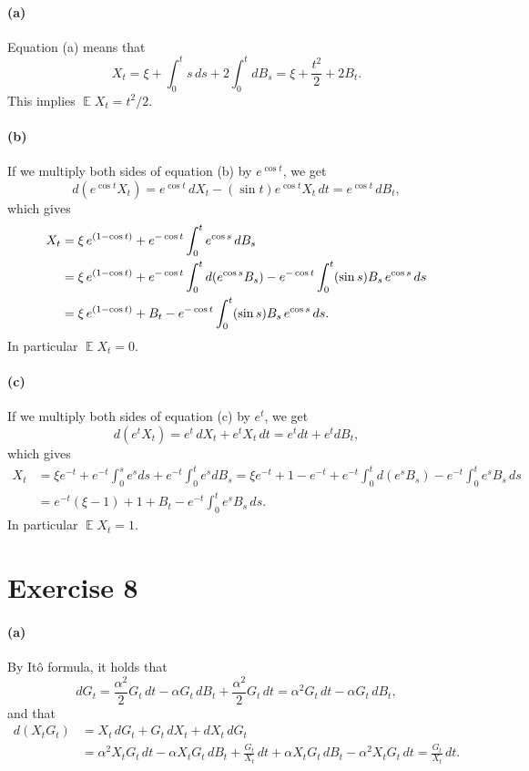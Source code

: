\documentclass[a4paper,11pt]{article}
\theoremstyle{definition}
\theoremstyle{plain}
\theoremstyle{remark}
\DeclarePairedDelimiter{\parr}{(}{)}
\DeclareMathOperator*{\expval}{\mathbb{E}}
\begin{document}
\paragraph*{(a)}

Equation (a) means that
$$
X_t = \xi + \int_0^ts\,ds + 2\int_0^tdB_s = \xi + \frac{t^2}{2} + 2B_t.
$$
This implies $\expval X_t = t^2/2$.

\paragraph*{(b)}

If we multiply both sides of equation (b) by $e^{\cos t}$, we get
$$
d(e^{\cos t}X_t) = e^{\cos t}\,dX_t - (\sin t)e^{\cos t}X_t\,dt = e^{\cos t}\,dB_t,
$$
which gives
\begin{align*}
X_t & = \xi\,e^{(1-\cos t)} + e^{-\cos t}\int_0^te^{\cos s}\,dB_s  \\ & = \xi\,e^{(1-\cos t)} + e^{-\cos t}\int_0^td\parr*{e^{\cos s}B_s} -e^{-\cos t}\int_0^t(\sin s)B_s\,e^{\cos s}\,ds \\ & = \xi\,e^{(1-\cos t)} + B_t -e^{-\cos t}\int_0^t(\sin s)B_s\,e^{\cos s}\,ds.
\end{align*}
In particular $\expval X_t = 0$.

\paragraph*{(c)}

If we multiply both sides of equation (c) by $e^t$, we get
$$
d(e^tX_t) = e^t\,dX_t + e^tX_t\,dt = e^tdt + e^tdB_t,
$$
which gives
\begin{align*}
X_t & = \xi e^{-t} + e^{-t}\int_0^se^sds + e^{-t}\int_0^te^sdB_s
= \xi e^{-t} + 1 - e^{-t} + e^{-t}\int_0^td(e^sB_s) - e^{-t}\int_0^t e^sB_s\,ds \\ & = e^{-t}(\xi -1) + 1 + B_t - e^{-t}\int_0^t e^sB_s\,ds.
\end{align*}
In particular $\expval X_t = 1$.

\section*{Exercise 8}

\paragraph*{(a)}

By It\^o formula, it holds that
$$
dG_t = \frac{\alpha^2}{2}G_t\,dt - \alpha G_t\,dB_t + \frac{\alpha^2}{2}G_t\,dt = \alpha^2 G_t\,dt - \alpha G_t\,dB_t,
$$
and that
\begin{align*}
d(X_tG_t) & = X_t\,dG_t + G_t\,dX_t + dX_t\,dG_t \\ & = \alpha^2X_tG_t\,dt - \alpha X_tG_t\,dB_t + \frac{G_t}{X_t}\,dt + \alpha X_tG_t\,dB_t -\alpha^2X_tG_t\,dt = \frac{G_t}{X_t}\,dt.
\end{align*}
\end{document}
